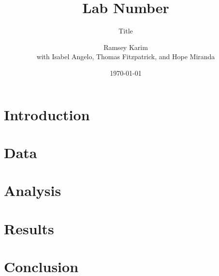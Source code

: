 \documentclass{aa}
\begin{document}
\title{Lab Number}
\subtitle{Title}
\author{Ramsey Karim \\ with Isabel Angelo, Thomas Fitzpatrick, and Hope Miranda}
\date{\today}


\maketitle












\section{Introduction} \label{s:1}



\section{Data} \label{s:2}



\section{Analysis} \label{s:3}



\section{Results} \label{s:4}



\section{Conclusion} \label{s:5}
\end{document}
